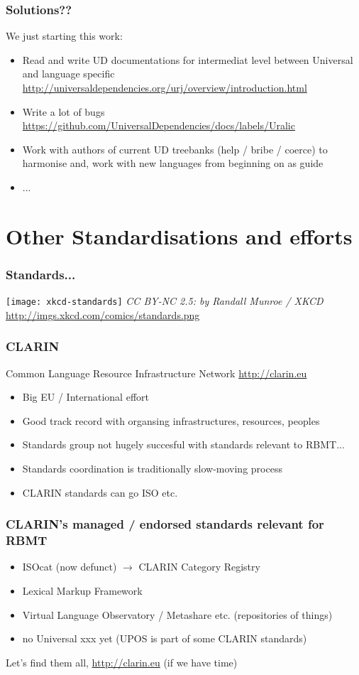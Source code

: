 \documentclass[t]{beamer}
\begin{document}
\begin{frame}
    \frametitle{Solutions??}
    We just starting this work:
    \begin{itemize}
        \item Read and write UD documentations for intermediat level between
            Universal and language specific \url{http://universaldependencies.org/urj/overview/introduction.html}
        \item Write a lot of bugs \url{https://github.com/UniversalDependencies/docs/labels/Uralic}
        \item Work with authors of current UD treebanks (help / bribe / coerce)
            to harmonise and, work with new languages from beginning on as
            guide
        \item ...
    \end{itemize}
\end{frame}

\section{Other Standardisations and efforts}

\begin{frame}
    \frametitle{Standards...}
    \texttt{[image: xkcd-standards]}
    \textit{CC BY-NC 2.5: by Randall Munroe / XKCD} 
    \url{http://imgs.xkcd.com/comics/standards.png}
\end{frame}

\begin{frame}
    \frametitle{CLARIN}
    Common Language Resource Infrastructure Network
    \url{http://clarin.eu}
    \begin{itemize}
        \item Big EU / International effort
        \item Good track record with organsing infrastructures, resources,
            peoples
        \item Standards group not hugely succesful with standards relevant to
            RBMT...
        \item Standards coordination is traditionally slow-moving process
        \item CLARIN standards can go ISO etc.
    \end{itemize}
\end{frame}

\begin{frame}
    \frametitle{CLARIN's managed / endorsed standards relevant for RBMT}
    \begin{itemize}
        \item ISOcat (now defunct) $\rightarrow$ CLARIN Category Registry
        \item Lexical Markup Framework
        \item Virtual Language Observatory / Metashare etc. (repositories of
            things)
        \item no Universal xxx yet (UPOS is part of some CLARIN standards)
    \end{itemize}
    Let's find them all, \url{http://clarin.eu} (if we have time)
\end{frame}
\end{document}

